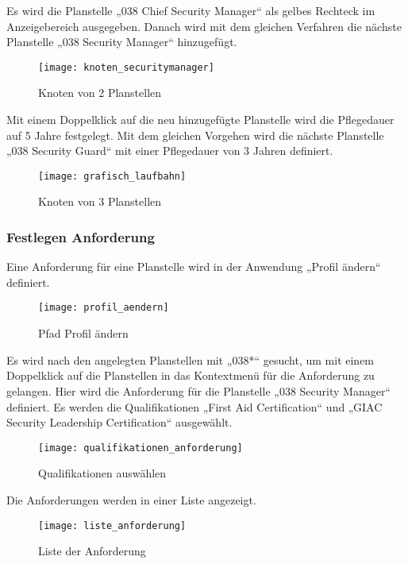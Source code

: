 Es wird die Planstelle „038 Chief Security Manager“ als gelbes Rechteck im Anzeigebereich ausgegeben. Danach wird mit dem gleichen Verfahren die nächste Planstelle „038 Security Manager“ hinzugefügt.
\begin{figure}[H]
	\centering
	\texttt{[image: knoten\_securitymanager]}
	\caption{Knoten von 2 Planstellen}
	\label{fig:knoten_securitymanager}
\end{figure}
Mit einem Doppelklick auf die neu hinzugefügte Planstelle wird die Pflegedauer auf 5 Jahre festgelegt. Mit dem gleichen Vorgehen wird die nächste Planstelle „038 Security Guard“ mit einer Pflegedauer von 3 Jahren definiert.
\begin{figure}[H]
	\centering
	\texttt{[image: grafisch\_laufbahn]}
	\caption{Knoten von 3 Planstellen}
	\label{fig:grafisch_laufbahn}
\end{figure}

\subsubsection{Festlegen Anforderung}
Eine Anforderung für eine Planstelle wird in der Anwendung „Profil ändern“ definiert.
\begin{figure}[H]
	\centering
	\texttt{[image: profil\_aendern]}
	\caption{Pfad Profil ändern}
	\label{fig:profil_aendern}
\end{figure}
Es wird nach den angelegten Planstellen mit „038*“ gesucht, um mit einem Doppelklick auf die Planstellen in das Kontextmenü für die Anforderung zu gelangen. Hier wird die Anforderung für die Planstelle „038 Security Manager“ definiert. Es werden die Qualifikationen „First Aid Certification“ und „GIAC Security Leadership Certification“ ausgewählt.
\begin{figure}[H]
	\centering
	\texttt{[image: qualifikationen\_anforderung]}
	\caption{Qualifikationen auswählen}
	\label{fig:qualifikationen_anforderung}
\end{figure}
Die Anforderungen werden in einer Liste angezeigt.
\begin{figure}[H]
	\centering
	\texttt{[image: liste\_anforderung]}
	\caption{Liste der Anforderung}
	\label{fig:liste_anforderung}
\end{figure}

